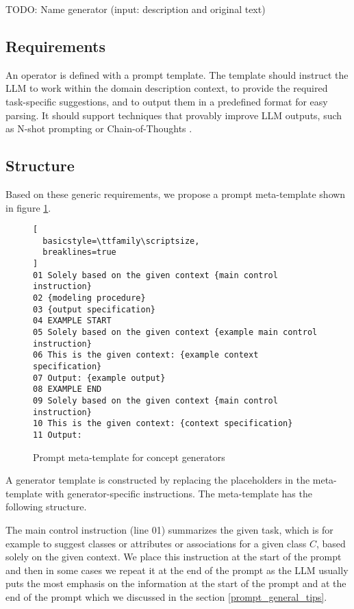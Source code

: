 TODO: Name generator (input: description and original text) \\


\subsection{Requirements}

An operator is defined with a prompt template. The template should instruct
the LLM to work within the domain description context, to provide the required
task-specific suggestions, and to output them in a predefined format for easy
parsing. It should support techniques that provably improve LLM outputs, such
as N-shot prompting \cite{Brown2020} or Chain-of-Thoughts \cite{Wei2022}.


\subsection{Structure}

Based on these generic requirements, we propose a prompt meta-template shown in figure \ref{fig:meta-templates}.

\begin{figure}[!h]
    \centering
\begin{lstlisting}[
  basicstyle=\ttfamily\scriptsize,
  breaklines=true
]
01 Solely based on the given context {main control instruction}
02 {modeling procedure}
03 {output specification}
04 EXAMPLE START
05 Solely based on the given context {example main control instruction}
06 This is the given context: {example context specification}
07 Output: {example output}
08 EXAMPLE END
09 Solely based on the given context {main control instruction}
10 This is the given context: {context specification}
11 Output:
\end{lstlisting}
    \caption{\centering Prompt meta-template for concept generators}
    \label{fig:meta-templates}
\end{figure}

A generator template is constructed by replacing the placeholders in the meta-template with generator-specific instructions. The meta-template has the following structure.

The main control instruction (line 01) summarizes the given task, which is for example to suggest classes or attributes or associations for a given class $C$, based solely on the given context. We place this instruction at the start of the prompt and then in some cases we repeat it at the end of the prompt as the LLM usually puts the most emphasis on the information at the start of the prompt and at the end of the prompt which we discussed in the section \ref{prompt_general_tips}.

